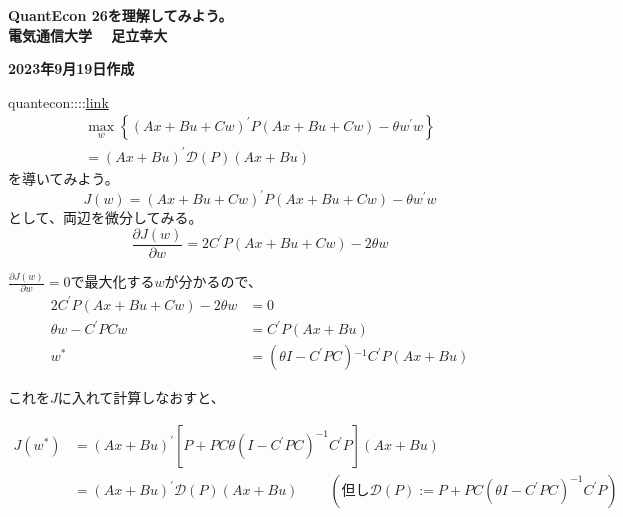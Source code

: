 \documentclass[a4paper,10pt,dvipdfmx]{jarticle}
\begin{document}
\begin{center}
{\Large{
\bf QuantEcon 26を理解してみよう。
\\
}}
{\bf 電気通信大学　 足立幸大 }

{\bf 2023年9月19日作成}　\\
\end{center}
quantecon::::\href{https://python-advanced.quantecon.org/robustness.html}{link}
\begin{equation}
    \begin{gathered}
    \max _w\left\{(A x+B u+C w)^{\prime} P(A x+B u+C w)-\theta w^{\prime} w\right\} \\
    =(A x+B u)^{\prime} \mathcal{D}(P)(A x+B u)
    \end{gathered}
    \end{equation}
    を導いてみよう。
    \begin{equation}
        J(w)=(A x+B u+C w)^{\prime} P(A x+B u+C w)-\theta w^{\prime} w
        \end{equation}として、両辺を微分してみる。
        \begin{equation}
            \frac{\partial J(w)}{\partial w}=2 C^{\prime} P(A x+B u+C w)-2 \theta w
            \end{equation}

$ \frac{\partial J(w)}{\partial w}=0$で最大化する$w$が分かるので、
\begin{align}
    2 C^{\prime} P(A x+B u+C w)-2 \theta w&=0 \\
    \theta w-C^{\prime} P Cw&=C^{\prime}P(Ax+Bu) \\
    w^*&=\left(\theta I-C^{\prime} P C\right){ }^{-1} C^{\prime} P(A x+B u)
\end{align}

これを$J$に入れて計算しなおすと、

\begin{align}
    J\left(w^*\right)&=(A x+B u)^{\prime}\left[P+P C \theta\left(I-C^{\prime} P C\right)^{-1} C^{\prime} P\right](A x+B u) \\
    &= (A x+B u)^{\prime} \mathcal{D}(P)(A x+B u) \ \ \ \ \ \ \ \ \ \ (但し\mathcal{D}(P):=P+P C\left(\theta I-C^{\prime} P C\right)^{-1} C^{\prime} P)
    \end{align}
\end{document}

